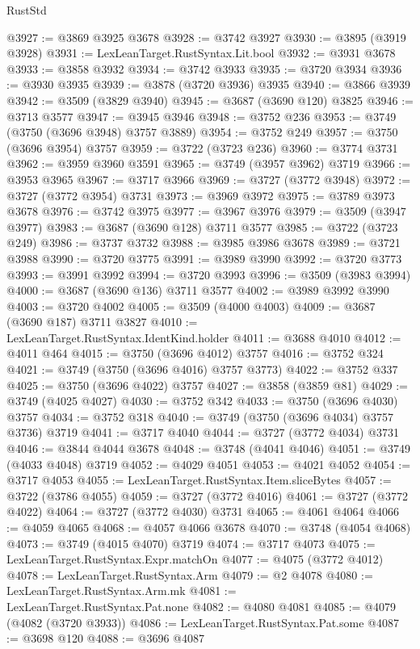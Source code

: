\begin{lexlean}{RustStd}
\begin{coremodule}
@3927 := @3869 @3925 @3678
@3928 := @3742 @3927
@3930 := @3895 (@3919 @3928)
@3931 := LexLeanTarget.RustSyntax.Lit.bool
@3932 := @3931 @3678
@3933 := @3858 @3932
@3934 := @3742 @3933
@3935 := @3720 @3934
@3936 := @3930 @3935
@3939 := @3878 (@3720 @3936) @3935
@3940 := @3866 @3939
@3942 := @3509 (@3829 @3940)
@3945 := @3687 (@3690 @120) @3825
@3946 := @3713 @3577
@3947 := @3945 @3946
@3948 := @3752 @236
@3953 := @3749 (@3750 (@3696 @3948) @3757 @3889)
@3954 := @3752 @249
@3957 := @3750 (@3696 @3954) @3757
@3959 := @3722 (@3723 @236)
@3960 := @3774 @3731
@3962 := @3959 @3960 @3591
@3965 := @3749 (@3957 @3962) @3719
@3966 := @3953 @3965
@3967 := @3717 @3966
@3969 := @3727 (@3772 @3948)
@3972 := @3727 (@3772 @3954) @3731
@3973 := @3969 @3972
@3975 := @3789 @3973 @3678
@3976 := @3742 @3975
@3977 := @3967 @3976
@3979 := @3509 (@3947 @3977)
@3983 := @3687 (@3690 @128) @3711 @3577
@3985 := @3722 (@3723 @249)
@3986 := @3737 @3732
@3988 := @3985 @3986 @3678
@3989 := @3721 @3988
@3990 := @3720 @3775
@3991 := @3989 @3990
@3992 := @3720 @3773
@3993 := @3991 @3992
@3994 := @3720 @3993
@3996 := @3509 (@3983 @3994)
@4000 := @3687 (@3690 @136) @3711 @3577
@4002 := @3989 @3992 @3990
@4003 := @3720 @4002
@4005 := @3509 (@4000 @4003)
@4009 := @3687 (@3690 @187) @3711 @3827
@4010 := LexLeanTarget.RustSyntax.IdentKind.holder
@4011 := @3688 @4010
@4012 := @4011 @464
@4015 := @3750 (@3696 @4012) @3757
@4016 := @3752 @324
@4021 := @3749 (@3750 (@3696 @4016) @3757 @3773)
@4022 := @3752 @337
@4025 := @3750 (@3696 @4022) @3757
@4027 := @3858 (@3859 @81)
@4029 := @3749 (@4025 @4027)
@4030 := @3752 @342
@4033 := @3750 (@3696 @4030) @3757
@4034 := @3752 @318
@4040 := @3749 (@3750 (@3696 @4034) @3757 @3736) @3719
@4041 := @3717 @4040
@4044 := @3727 (@3772 @4034) @3731
@4046 := @3844 @4044 @3678
@4048 := @3748 (@4041 @4046)
@4051 := @3749 (@4033 @4048) @3719
@4052 := @4029 @4051
@4053 := @4021 @4052
@4054 := @3717 @4053
@4055 := LexLeanTarget.RustSyntax.Item.sliceBytes
@4057 := @3722 (@3786 @4055)
@4059 := @3727 (@3772 @4016)
@4061 := @3727 (@3772 @4022)
@4064 := @3727 (@3772 @4030) @3731
@4065 := @4061 @4064
@4066 := @4059 @4065
@4068 := @4057 @4066 @3678
@4070 := @3748 (@4054 @4068)
@4073 := @3749 (@4015 @4070) @3719
@4074 := @3717 @4073
@4075 := LexLeanTarget.RustSyntax.Expr.matchOn
@4077 := @4075 (@3772 @4012)
@4078 := LexLeanTarget.RustSyntax.Arm
@4079 := @2 @4078
@4080 := LexLeanTarget.RustSyntax.Arm.mk
@4081 := LexLeanTarget.RustSyntax.Pat.none
@4082 := @4080 @4081
@4085 := @4079 (@4082 (@3720 @3933))
@4086 := LexLeanTarget.RustSyntax.Pat.some
@4087 := @3698 @120
@4088 := @3696 @4087

\end{coremodule}
\end{lexlean}
